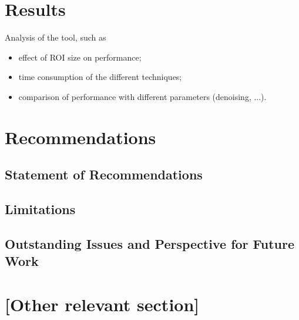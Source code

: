 \documentclass[11pt]{scrartcl}
\begin{document}
\section{Results}

Analysis of the tool, such as
\begin{itemize}
\item effect of ROI size on performance;
\item time consumption of the different techniques;
\item comparison of performance with different parameters (denoising, ...).
\end{itemize}



\section{Recommendations}


\subsection{Statement of Recommendations}


\subsection{Limitations}


\subsection{Outstanding Issues and Perspective for Future Work}




\section{[Other relevant section]}








\end{document}
